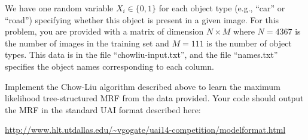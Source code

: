 \documentclass{article}
\begin{document}
\begin{enumerate}
We have one random variable $X_i\in \{0,1\}$ for each object type (e.g., ``car'' or ``road'') specifying whether this object is present in a given image. For this problem, you are provided with a matrix of dimension $N \times M$ where $N=4367$ is the number of images in the training set and $M=111$ is the number of object types. This data is in the file ``chowliu-input.txt'', and the file ``names.txt'' specifies the object names corresponding to each column.


Implement the Chow-Liu algorithm described above to learn the maximum
likelihood tree-structured MRF from the data provided. Your code should output the MRF in the standard UAI format described here:
\begin{center}
\url{http://www.hlt.utdallas.edu/~vgogate/uai14-competition/modelformat.html}
\end{center}



\end{enumerate}
\end{document}

